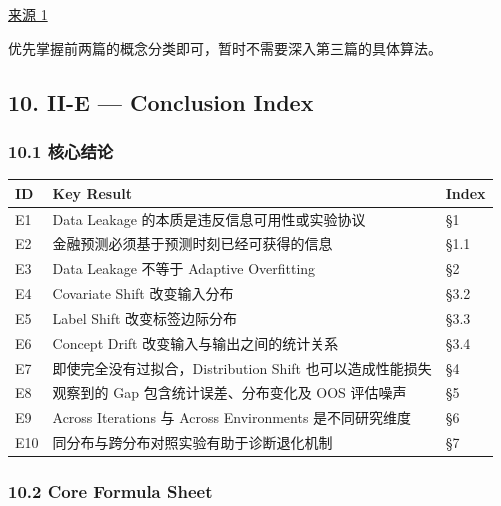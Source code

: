 \href{https://proceedings.mlr.press/v80/lipton18a}{来源 1}

优先掌握前两篇的概念分类即可，暂时不需要深入第三篇的具体算法。

\hypertarget{part-2-23-0001-ii-e-conclusion-index}{%
\subsection{10. II-E --- Conclusion Index}\label{part-2-23-0001-ii-e-conclusion-index}}

\hypertarget{part-2-23-0001-ux6838ux5fc3ux7ed3ux8bba}{%
\subsubsection{10.1 核心结论}\label{part-2-23-0001-ux6838ux5fc3ux7ed3ux8bba}}

\begin{readertable}
\begin{longtable}[]{@{}
  >{\raggedright\arraybackslash}p{}
  >{\raggedright\arraybackslash}p{}
  >{\raggedright\arraybackslash}p{}@{}}
\toprule
ID & Key Result & Index \\
\midrule
\endhead
E1 & Data Leakage 的本质是违反信息可用性或实验协议 & §1 \\
E2 & 金融预测必须基于预测时刻已经可获得的信息 & §1.1 \\
E3 & Data Leakage 不等于 Adaptive Overfitting & §2 \\
E4 & Covariate Shift 改变输入分布 & §3.2 \\
E5 & Label Shift 改变标签边际分布 & §3.3 \\
E6 & Concept Drift 改变输入与输出之间的统计关系 & §3.4 \\
E7 & 即使完全没有过拟合，Distribution Shift 也可以造成性能损失 & §4 \\
E8 & 观察到的 Gap 包含统计误差、分布变化及 OOS 评估噪声 & §5 \\
E9 & Across Iterations 与 Across Environments 是不同研究维度 & §6 \\
E10 & 同分布与跨分布对照实验有助于诊断退化机制 & §7 \\
\bottomrule
\end{longtable}
\end{readertable}

\hypertarget{part-2-23-0001-core-formula-sheet}{%
\subsubsection{10.2 Core Formula Sheet}\label{part-2-23-0001-core-formula-sheet}}

